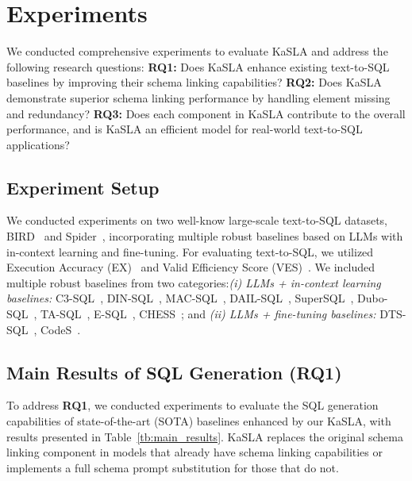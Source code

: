 \section{Experiments}
\label{sec:Experiments}


We conducted comprehensive experiments to evaluate KaSLA and address the following research questions: \textbf{RQ1:} Does KaSLA enhance existing text-to-SQL baselines by improving their schema linking capabilities? \textbf{RQ2:} Does KaSLA demonstrate superior schema linking performance by handling element missing and redundancy? \textbf{RQ3:} Does each component in KaSLA contribute to the overall performance, and is KaSLA an efficient model for real-world text-to-SQL applications?


\subsection{Experiment Setup}\label{sec: Experiment Setup}
We conducted experiments on two well-know large-scale text-to-SQL datasets, BIRD~\citep{li2023BIRD} and Spider~\citep{yu2018Spider}, incorporating multiple robust baselines based on LLMs with in-context learning and fine-tuning. For evaluating text-to-SQL, we utilized Execution Accuracy (EX)~\citep{yu2018Spider,li2023BIRD} and Valid Efficiency Score (VES)~\citep{li2023BIRD}. We included multiple robust baselines from two categories:\emph{(i) LLMs + in-context learning baselines:} C3-SQL~\citep{dong2023c3}, DIN-SQL~\citep{pourreza2023dinsql}, MAC-SQL~\citep{wang2024macsql}, DAIL-SQL~\citep{gao2023dailsql}, SuperSQL~\citep{li2024dawn}, Dubo-SQL~\citep{thorpe2024dubo}, TA-SQL~\citep{qu2024before}, E-SQL~\citep{caferouglu2024sql}, CHESS~\citep{talaei2024chess}; and \emph{(ii) LLMs + fine-tuning baselines:} DTS-SQL~\citep{pourreza2024dtssql}, CodeS~\citep{li2024codes}.

\subsection{Main Results of SQL Generation (\textbf{RQ1})}
To address \textbf{RQ1}, we conducted experiments to evaluate the SQL generation capabilities of state-of-the-art (SOTA) baselines enhanced by our KaSLA, with results presented in Table~\ref{tb:main_results}. KaSLA replaces the original schema linking component in models that already have schema linking capabilities or implements a full schema prompt substitution for those that do not.

